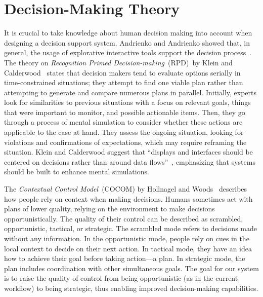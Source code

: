 \documentclass{egpubl}
\begin{document}

\section{Decision-Making Theory} \label{sec:theory}
It is crucial to take knowledge about human decision making into account when designing a decision support system. Andrienko and Andrienko showed that, in general, the usage of explorative interactive tools support the decision process~\cite{Andrienko:2003kv}. The theory on \emph{Recognition Primed Decision-making}~(RPD)~by Klein and Calderwood~\cite{KleinCalderwood} states that decision makers tend to evaluate options serially in time-constrained situations; they attempt to find one viable plan rather than attempting to generate and compare numerous plans in parallel. Initially, experts look for similarities to previous situations with a focus on relevant goals, things that were important to monitor, and possible actionable items. Then, they go through a process of mental simulation to consider whether these actions are applicable to the case at hand. They assess the ongoing situation, looking for violations and confirmations of expectations, which may require reframing the situation. Klein and Calderwood suggest that ``displays and interfaces should be centered on decisions rather than around data flows''~\cite{KleinCalderwood}, emphasizing that systems should be built to enhance mental simulations. 

The \emph{Contextual Control Model}~(COCOM) by Hollnagel and Woods~\cite{hollnagel2005joint} describes how people rely on context when making decisions. Humans sometimes act with plans of lower quality, relying on the environment to make decisions opportunistically. The quality of their control can be described as scrambled, opportunistic, tactical, or strategic. The scrambled mode refers to decisions made without any information. In the opportunistic mode, people rely on cues in the local context to decide on their next action. In tactical mode, they have an idea how to achieve their goal before taking action---a plan. In strategic mode, the plan includes coordination with other simultaneous goals. The goal for our system is to raise the quality of control from being opportunistic (as in the current workflow) to being strategic, thus enabling improved decision-making capabilities.
\end{document}
